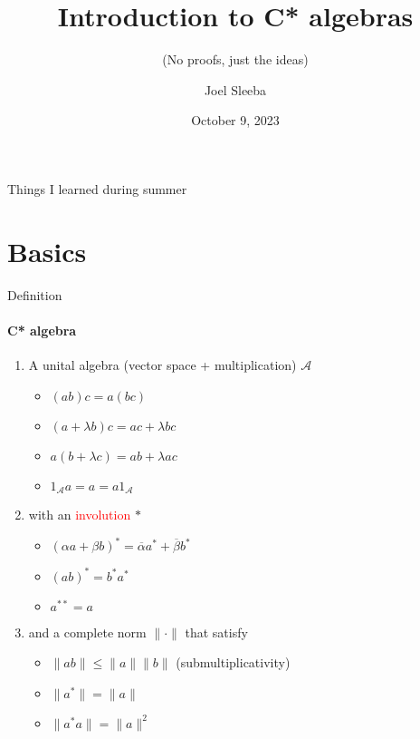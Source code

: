 \documentclass[dvipsnames]{beamer}
\newcommand{\1}{\mathds{1}}	%
\begin{document}

\title{\color{titleText}Introduction to C* algebras}
\subtitle{\color{Blue}(No proofs, just the ideas)}
\author{Joel Sleeba\vspace{-.3cm}}
\date{\small October 9, 2023}

\begin{frame}
\titlepage
\vspace{-1.2cm}
\begin{center}
{\begin{spacing}{1.2}\scriptsize 
  Things I learned during summer
\end{spacing}}
\end{center}
\end{frame}

\section{Basics}

\begin{frame}{Definition}
\framesubtitle{C* algebra}
\begin{enumerate}
  \item A unital algebra (vector space + multiplication) $\mathcal{A}$
    \begin{itemize}
      \item $(ab)c = a(bc)$
      \item $(a+ \lambda b)c = ac + \lambda bc$
      \item $a(b+ \lambda c) = ab + \lambda ac$
      \item $1_\mathcal{A} a = a = a1_\mathcal{A}$
    \end{itemize}
    \pause
  \item with an \textcolor{red}{involution} $*$
    \begin{itemize}
      \item $(\alpha a+\beta b)^* = \overline{\alpha}a^* + \overline{\beta}b^*$
      \item $(ab)^* = b^*a^*$
      \item $a^{**} = a$
    \end{itemize}
    \pause
  \item and a complete norm $\|\cdot \|$ that satisfy
    \begin{itemize}
      \item $\|ab\| \le \|a\| \|b\|$ (submultiplicativity)
      \item $\|a^*\| = \|a\|$
      \item $\|a^*a\| = \|a\|^2$
    \end{itemize}
\end{enumerate}
\end{frame}
\end{document}
